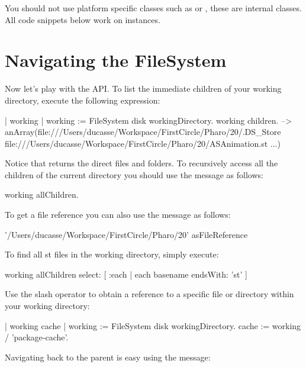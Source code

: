 \documentclass[a4paper,10pt,twoside]{book}
\begin{document}
You should not use platform specific classes such as  or , these are internal classes. All code snippets below work on  instances.


\section{Navigating the FileSystem}

Now let's play with the API. To list the immediate children of your working directory, execute the following expression:

\begin{code}{}
| working |
working := FileSystem disk workingDirectory.
working children.
--> anArray(file:///Users/ducasse/Workspace/FirstCircle/Pharo/20/.DS_Store file:///Users/ducasse/Workspace/FirstCircle/Pharo/20/ASAnimation.st ...)
\end{code} 

Notice that  returns the direct files and folders. 
To recursively access all the children of the current directory you should use the message  as follows:

\begin{code}{}
working allChildren.
\end{code}


To get a file reference you can also use the  message as follows: 

\begin{code}{}
'/Users/ducasse/Workspace/FirstCircle/Pharo/20' asFileReference
\end{code}



To find all st files in the working directory, simply execute:

\begin{code}{}
working allChildren select: [ :each | each basename endsWith: 'st' ]
\end{code} 
 
Use the slash operator to obtain a reference to a specific file or directory within your working directory:

\begin{code}{}
| working cache |
working := FileSystem disk workingDirectory.
cache := working / 'package-cache'.
\end{code} 

Navigating back to the parent is easy using the  message:
\end{document}
